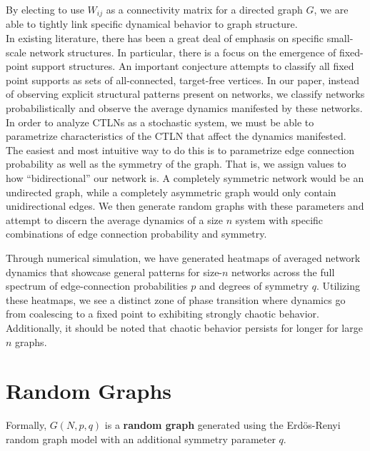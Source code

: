 \documentclass[psamsfonts]{amsart}
\theoremstyle{definition}
\theoremstyle{remark}
\numberwithin{equation}{section}
\begin{document}
By electing to use $W_{ij}$ as a connectivity matrix for a directed graph $G$, we are able to tightly link specific dynamical behavior to graph structure.
\\

In existing literature, there has been a great deal of emphasis on specific small-scale network structures. In particular, there is a focus on the emergence of fixed-point support structures. An important conjecture attempts to classify all fixed point supports as sets of all-connected, target-free vertices. In our paper, instead of observing explicit structural patterns present on networks, we classify networks probabilistically and observe the average dynamics manifested by these networks.
\\

In order to analyze CTLNs as a stochastic system, we must be able to parametrize characteristics of the CTLN that affect the dynamics manifested. The easiest and most intuitive way to do this is to parametrize edge connection probability as well as the symmetry of the graph. That is, we assign values to how ``bidirectional'' our network is. A completely symmetric network would be an undirected graph, while a completely asymmetric graph would only contain unidirectional edges. We then generate random graphs with these parameters and attempt to discern the average dynamics of a size $n$ system with specific combinations of edge connection probability and symmetry.

Through numerical simulation, we have generated heatmaps of averaged network dynamics that showcase general patterns for size-$n$ networks across the full spectrum of edge-connection probabilities $p$ and degrees of symmetry $q$. Utilizing these heatmaps, we see a distinct zone of phase transition where dynamics go from coalescing to a fixed point to exhibiting strongly chaotic behavior. Additionally, it should be noted that chaotic behavior persists for longer for large $n$ graphs.\\

\section{Random Graphs} %
\label{sec:random_graphs}

Formally, $G(N,p,q)$ is a \textbf{random graph} generated using the Erd{\"o}s-Renyi random graph model with an additional symmetry parameter $q$.
\end{document}
